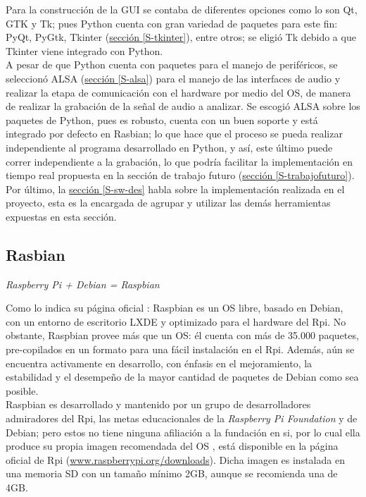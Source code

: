 \documentclass[11pt,lettersize]{article} %
\newcommand{\seccion}[1]{\hyperref[{#1}]{sección \ref*{#1}}}
\begin{document}
Para la construcción de la GUI se contaba de diferentes opciones como lo son Qt, GTK y Tk; pues Python cuenta con gran variedad de paquetes para este fin: PyQt, PyGtk, Tkinter (\seccion{S-tkinter}), entre otros; se eligió Tk debido a que Tkinter viene integrado con Python.\\

A pesar de que Python cuenta con paquetes para el manejo de periféricos, se seleccionó ALSA (\seccion{S-alsa}) para el manejo de las interfaces de audio y realizar la etapa de comunicación con el hardware por medio del OS, de manera de realizar la grabación de la señal de audio a analizar. Se escogió ALSA sobre los paquetes de Python, pues es robusto, cuenta con un buen soporte y está integrado por defecto en Rasbian; lo que hace que el proceso se pueda realizar independiente al programa desarrollado en Python, y así, este último puede correr independiente a la grabación, lo que podría facilitar la implementación en tiempo real propuesta en la sección de trabajo futuro (\seccion{S-trabajofuturo}). Por último, la \seccion{S-sw-des} habla sobre la implementación realizada en el proyecto, esta es la encargada de agrupar y utilizar las demás herramientas expuestas en esta sección.

\subsection{Rasbian}

\begin{center}
	\textit{Raspberry Pi + Debian = Raspbian}\cite{ElinuxDistributions} %
\end{center}

Como lo indica su página oficial \cite{Raspbian}: Raspbian es un OS libre, basado en Debian, con un entorno de escritorio LXDE y optimizado para el hardware del Rpi. No obstante, Raspbian provee más que un OS: él cuenta con más de 35.000 paquetes, pre-copilados en un formato para una fácil instalación en el Rpi. Además, aún se encuentra activamente en desarrollo, con énfasis en el mejoramiento, la estabilidad y el desempeño de la mayor cantidad de paquetes de Debian como sea posible.\\

Raspbian es desarrollado y mantenido por un grupo de desarrolladores admiradores del Rpi, las metas educacionales de la \emph{Raspberry Pi Foundation} y de Debian; pero estos no tiene ninguna afiliación a la fundación en si, por lo cual ella produce su propia imagen recomendada del OS \cite{Raspbian}, está disponible en la página oficial de Rpi (\href{http://www.raspberrypi.org/downloads}{www.raspberrypi.org/downloads}). Dicha imagen es instalada en una memoria SD con un tamaño mínimo 2GB, aunque se recomienda una de 4GB.
\end{document}
